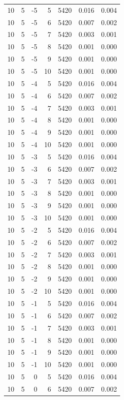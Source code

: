 \begin{table}
\begin{tabular}{rrrrrrr}
10 & 5 & -5 & 5 & 5420 & 0.016 & 0.004 \\
10 & 5 & -5 & 6 & 5420 & 0.007 & 0.002 \\
10 & 5 & -5 & 7 & 5420 & 0.003 & 0.001 \\
10 & 5 & -5 & 8 & 5420 & 0.001 & 0.000 \\
10 & 5 & -5 & 9 & 5420 & 0.001 & 0.000 \\
10 & 5 & -5 & 10 & 5420 & 0.001 & 0.000 \\
10 & 5 & -4 & 5 & 5420 & 0.016 & 0.004 \\
10 & 5 & -4 & 6 & 5420 & 0.007 & 0.002 \\
10 & 5 & -4 & 7 & 5420 & 0.003 & 0.001 \\
10 & 5 & -4 & 8 & 5420 & 0.001 & 0.000 \\
10 & 5 & -4 & 9 & 5420 & 0.001 & 0.000 \\
10 & 5 & -4 & 10 & 5420 & 0.001 & 0.000 \\
10 & 5 & -3 & 5 & 5420 & 0.016 & 0.004 \\
10 & 5 & -3 & 6 & 5420 & 0.007 & 0.002 \\
10 & 5 & -3 & 7 & 5420 & 0.003 & 0.001 \\
10 & 5 & -3 & 8 & 5420 & 0.001 & 0.000 \\
10 & 5 & -3 & 9 & 5420 & 0.001 & 0.000 \\
10 & 5 & -3 & 10 & 5420 & 0.001 & 0.000 \\
10 & 5 & -2 & 5 & 5420 & 0.016 & 0.004 \\
10 & 5 & -2 & 6 & 5420 & 0.007 & 0.002 \\
10 & 5 & -2 & 7 & 5420 & 0.003 & 0.001 \\
10 & 5 & -2 & 8 & 5420 & 0.001 & 0.000 \\
10 & 5 & -2 & 9 & 5420 & 0.001 & 0.000 \\
10 & 5 & -2 & 10 & 5420 & 0.001 & 0.000 \\
10 & 5 & -1 & 5 & 5420 & 0.016 & 0.004 \\
10 & 5 & -1 & 6 & 5420 & 0.007 & 0.002 \\
10 & 5 & -1 & 7 & 5420 & 0.003 & 0.001 \\
10 & 5 & -1 & 8 & 5420 & 0.001 & 0.000 \\
10 & 5 & -1 & 9 & 5420 & 0.001 & 0.000 \\
10 & 5 & -1 & 10 & 5420 & 0.001 & 0.000 \\
10 & 5 & 0 & 5 & 5420 & 0.016 & 0.004 \\
10 & 5 & 0 & 6 & 5420 & 0.007 & 0.002 \\

\end{tabular}
\end{table}
